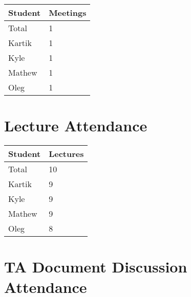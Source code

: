 \documentclass{article}
\begin{document}

\begin{table}[H]
\centering
\begin{tabular}{ll}
\toprule
\textbf{Student} & \textbf{Meetings}\\
\midrule
Total  & 1\\
Kartik & 1\\
Kyle   & 1\\
Mathew & 1\\
Oleg   & 1\\
\bottomrule
\end{tabular}
\end{table}


\section{Lecture Attendance}


\begin{table}[H]
\centering
\begin{tabular}{ll}
\toprule
\textbf{Student} & \textbf{Lectures}\\
\midrule
Total & 10\\
Kartik & 9\\
Kyle   & 9\\
Mathew & 9\\
Oleg   & 8\\
\bottomrule
\end{tabular}
\end{table}


\section{TA Document Discussion Attendance}
\end{document}
